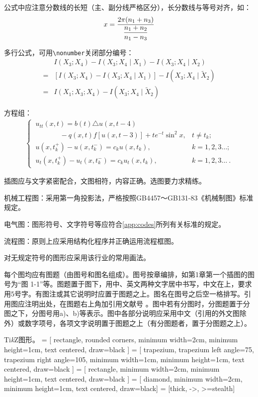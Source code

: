 公式中应注意分数线的长短（主、副分线严格区分），长分数线与等号对齐，如：
\begin{equation}
    x = \frac{2\pi(n_1+n_3)}{\dfrac{n_1+n_2}{n_1-n_3}}
    \\[\belowdisplayskip]
\end{equation}

多行公式，可用\verb|\nonumber|关闭部分编号：
\begin{align}\label{eq:align}
      & I(X_3;X_4)-I(X_3;X_4\mid{}X_1)-I(X_3;X_4\mid{}X_2)\\
    = & [I(X_3;X_4)-I(X_3;X_4\mid{}X_1)]-I(X_3;X_4\mid{}\tilde{X}_2)\nonumber\\
    = & I(X_1;X_3;X_4)-I(X_3;X_4\mid{}\tilde{X}_2)
\end{align}

方程组：
\begin{align}
    \begin{cases}
        \ u_{tt}(x,t)= b(t)\triangle u(x,t-4)                & \\
        \ \hspace{42pt}- q(x,t)f[u(x,t-3)]+te^{-t}\sin^2 x,  & t\neq t_k; \\
        \ u(x,t_k^+) - u(x,t_k^-) = c_k u(x,t_k),            & k=1,2,3\ldots ;\\
        \ u_{t}(x,t_k^+) - u_{t}(x,t_k^-) =c_k u_{t}(x,t_k), & k=1,2,3\ldots\ .
    \end{cases}
\end{align}

插图应与文字紧密配合，文图相符，内容正确。选图要力求精练。

机械工程图：采用第一角投影法，严格按照GB4457～GB131-83《机械制图》标准规定。

电气图：图形符号、文字符号等应符合\cref{app:codes}所列有关标准的规定。

流程图：原则上应采用结构化程序并正确运用流程框图。

对无规定符号的图形应采用该行业的常用画法。

每个图均应有图题（由图号和图名组成）。图号按章编排，如第1章第一个插图的图号为“图 1-1”等。图题置于图下，用中、英文两种文字居中书写，中文在上，要求用5号字。有图注或其它说明时应置于图题之上。图名在图号之后空一格排写。引用图应注明出处，在图题右上角加引用文献号 。图中若有分图时，分图题置于分图之下，分图号用a)、b)等表示。图中各部分说明应采用中文（引用的外文图除外）或数字项号，各项文字说明置于图题之上（有分图题者，置于分图题之上）。

Ti\textit{k}Z图形。
\usetikzlibrary{shapes.geometric, arrows}
 = [
rectangle,
rounded corners,
minimum width=2cm,
minimum height=1cm,
text centered,
draw=black
]
 = [
trapezium,
trapezium left angle=75,
trapezium right angle=105,
minimum width=1cm,
minimum height=1cm,
text centered,
draw=black
]
 = [
rectangle,
minimum width=2cm,
minimum height=1cm,
text centered,
draw=black
]
 = [
diamond,
minimum width=2cm,
minimum height=1cm,
text centered,
draw=black]
 = [thick, ->, >=stealth]

